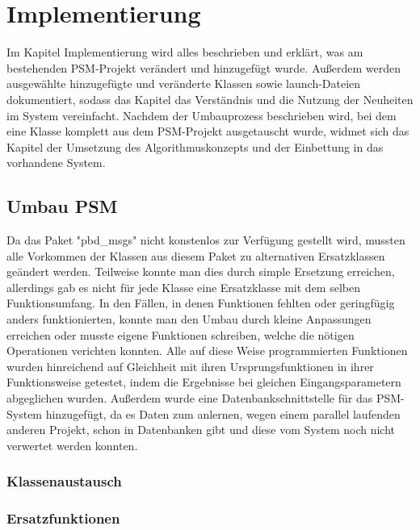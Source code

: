 \chapter{Implementierung}\label{ch:implementierung}

Im Kapitel Implementierung wird alles beschrieben und erklärt, was am bestehenden PSM-Projekt verändert und hinzugefügt wurde. Außerdem werden ausgewählte hinzugefügte und veränderte Klassen sowie launch-Dateien dokumentiert, sodass das Kapitel das Verständnis und die Nutzung der Neuheiten im System vereinfacht. Nachdem der Umbauprozess beschrieben wird, bei dem eine Klasse komplett aus dem PSM-Projekt ausgetauscht wurde, widmet sich das Kapitel der Umsetzung des Algorithmuskonzepts und der Einbettung in das vorhandene System.

\section{Umbau PSM}
Da das Paket "pbd\_msgs" nicht konstenlos zur Verfügung gestellt wird, mussten alle Vorkommen der Klassen aus diesem Paket zu alternativen Ersatzklassen geändert werden. Teilweise konnte man dies durch simple Ersetzung erreichen, allerdings gab es nicht für jede Klasse eine Ersatzklasse mit dem selben Funktionsumfang. In den Fällen, in denen Funktionen fehlten oder geringfügig anders funktionierten, konnte man den Umbau durch kleine Anpassungen erreichen oder musste eigene Funktionen schreiben, welche die nötigen Operationen verichten konnten. Alle auf diese Weise programmierten Funktionen wurden hinreichend auf Gleichheit mit ihren Ursprungsfunktionen in ihrer Funktionsweise getestet, indem die Ergebnisse bei gleichen Eingangsparametern abgeglichen wurden. Außerdem wurde eine Datenbankschnittstelle für das PSM-System hinzugefügt, da es Daten zum anlernen, wegen einem parallel laufenden anderen Projekt, schon in Datenbanken gibt und diese vom System noch nicht verwertet werden konnten.
\subsection{Klassenaustausch}

\subsection{Ersatzfunktionen}

